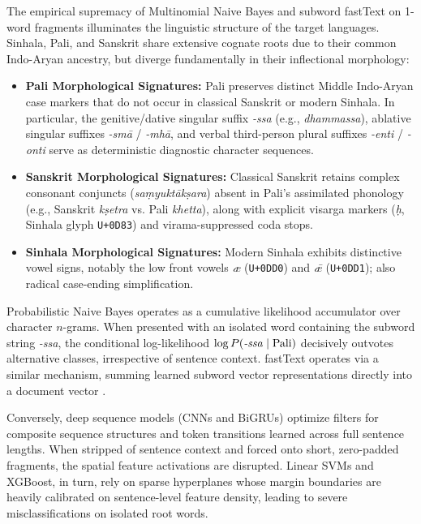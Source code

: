 \documentclass[11pt]{article}
\begin{document}
The empirical supremacy of Multinomial Naive Bayes and subword fastText on 1-word fragments illuminates the linguistic structure of the target languages. Sinhala, Pali, and Sanskrit share extensive cognate roots due to their common Indo-Aryan ancestry, but diverge fundamentally in their inflectional morphology:
\begin{itemize}
    \item \textbf{Pali Morphological Signatures:} Pali preserves distinct Middle Indo-Aryan case markers that do not occur in classical Sanskrit or modern Sinhala. In particular, the genitive/dative singular suffix \textit{-ssa} (e.g., \textit{dhammassa}), ablative singular suffixes \textit{-smā} / \textit{-mhā}, and verbal third-person plural suffixes \textit{-enti} / \textit{-onti} serve as deterministic diagnostic character sequences.
    \item \textbf{Sanskrit Morphological Signatures:} Classical Sanskrit retains complex consonant conjuncts (\textit{saṃyuktākṣara}) absent in Pali's assimilated phonology (e.g., Sanskrit \textit{kṣetra} vs. Pali \textit{khetta}), along with explicit visarga markers (\textit{ḥ}, Sinhala glyph \texttt{U+0D83}) and virama-suppressed coda stops.
    \item \textbf{Sinhala Morphological Signatures:} Modern Sinhala exhibits distinctive vowel signs, notably the low front vowels \textit{æ} (\texttt{U+0DD0}) and \textit{ǣ} (\texttt{U+0DD1}); also radical case-ending simplification.
\end{itemize}

Probabilistic Naive Bayes operates as a cumulative likelihood accumulator over character $n$-grams. When presented with an isolated word containing the subword string \textit{-ssa}, the conditional log-likelihood $\log P(\text{\textit{-ssa}} \mid \text{Pali})$ decisively outvotes alternative classes, irrespective of sentence context. fastText operates via a similar mechanism, summing learned subword vector representations directly into a document vector \cite{mikolov2013distributed}.

Conversely, deep sequence models (CNNs and BiGRUs) optimize filters for composite sequence structures and token transitions learned across full sentence lengths. When stripped of sentence context and forced onto short, zero-padded fragments, the spatial feature activations are disrupted. Linear SVMs and XGBoost, in turn, rely on sparse hyperplanes whose margin boundaries are heavily calibrated on sentence-level feature density, leading to severe misclassifications on isolated root words.
\end{document}
